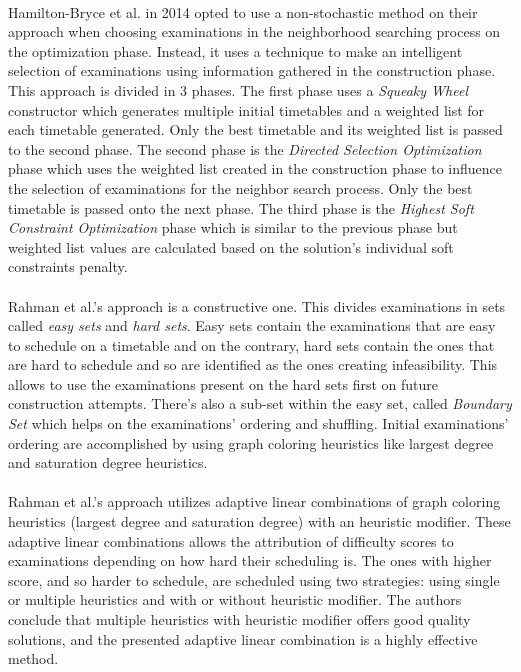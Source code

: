 \\
Hamilton-Bryce et al. \cite{Hamilton-Bryce2014} in 2014 opted to use a non-stochastic method on their approach \cite{Hamilton-Bryce2014} when choosing examinations in the neighborhood searching process on the optimization phase. Instead, it uses a technique to make an intelligent selection of examinations using information gathered in the construction phase. This approach is divided in 3 phases. The first phase uses a \textit{Squeaky Wheel} constructor which generates multiple initial timetables and a weighted list for each timetable generated. Only the best timetable and its weighted list is passed to the second phase. The second phase is the \textit{Directed Selection Optimization} phase which uses the weighted list created in the construction phase to influence the selection of examinations for the neighbor search process. Only the best timetable is passed onto the next phase. The third phase is the \textit{Highest Soft Constraint Optimization} phase which is similar to the previous phase but weighted list values are calculated based on the solution's individual soft constraints penalty.\\
\\
Rahman et al.'s approach \cite{Rahman2014} is a constructive one. This divides examinations in sets called \textit{easy sets} and \textit{hard sets}. Easy sets contain the examinations that are easy to schedule on a timetable and on the contrary, hard sets contain the ones that are hard to schedule and so are identified as the ones creating infeasibility. This allows to use the examinations present on the hard sets first on future construction attempts. There's also a sub-set within the easy set, called \textit{Boundary Set} which helps on the examinations' ordering and shuffling. Initial examinations' ordering  are accomplished by using graph coloring heuristics like largest degree and saturation degree heuristics.\\
\\
Rahman et al.'s approach \cite{Rahman2014a} utilizes adaptive linear combinations of graph coloring heuristics (largest degree and saturation degree) with an heuristic modifier. These adaptive linear combinations allows the attribution of difficulty scores to examinations depending on how hard their scheduling is. The ones with higher score, and so harder to schedule, are scheduled using two strategies: using single or multiple heuristics and with or without heuristic modifier. The authors conclude that multiple heuristics with heuristic modifier offers good quality solutions, and the presented adaptive linear combination is a highly effective method.\\


